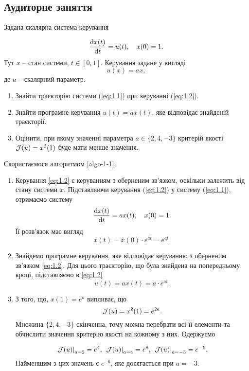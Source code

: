 \subsection{Аудиторне заняття}

\begin{problem}
	Задана скалярна система керування 
	
	\begin{equation}
		\label{eq:1.1}
		\frac{\mathop{}\!\mathrm{d} x(t)}{\mathop{}\!\mathrm{d} t} = u(t), \quad x(0) = 1.
	\end{equation}
	Тут $x$ -- стан системи, $t \in [0, 1]$. Керування задане у вигляді
	\begin{equation}
		\label{eq:1.2}
		u(x) = a x,
	\end{equation}
	де $a$ -- скалярний параметр.

	\begin{enumerate}
		\item Знайти траєкторію системи (\ref{eq:1.1}) при керуванні (\ref{eq:1.2}).

		\item Знайти програмне керування $u(t) = a x (t)$, яке відповідає знайденій траєкторії. 

		\item Оцінити, при якому значенні параметра $a \in \{2, 4, -3\}$ критерій якості $\mathcal{J}(u) = x^2 (1)$ буде мати менше значення.
	\end{enumerate}
\end{problem}

\begin{solution}
    Скористаємося алгоритмом \ref{algo-1-1}.
    
	\begin{enumerate}
	    \item Керування  \eqref{eq:1.2} є керуванням з оберненим зв'язком, оскільки залежить від стану системи $x$. Підставляючи керування (\ref{eq:1.2}) у систему (\ref{eq:1.1}), отримаємо систему \[ \frac{\mathop{}\!\mathrm{d} x(t)}{\mathop{}\!\mathrm{d} t} = a x(t), \quad x(0) = 1. \]
		Її розв'язок має вигляд \[ x(t) = x(0) \cdot e^{a t} = e^{a t}. \]
		\item Знайдемо програмне керування, яке відповідає керуванню з оберненим зв'язком \eqref{eq:1.2}. Для цього траєкторію, що була знайдена на попередньому кроці, підставляємо в \eqref{eq:1.2} \[ u(t) = a x(t) = a \cdot e^{a t}. \]
		\item З того, що, $x(1) = e^{a}$ випливає, що 
		\[\mathcal{J}(u) = x^2 (1)=e^{2a}.\]
		Множина $\{2, 4, -3\}$ скінченна, тому можна  перебрати всі її елементи та обчислити значення критерію якості на кожному з них. Одержуємо 
		
		\[ \left.\mathcal{J} (u) \right|_{a = 2} = e^4, \  \left. \mathcal{J} (u) \right|_{a = 4} = e^8, \ \left. \mathcal{J} (u) \right|_{a = -3} = e^{-6}. \]
		Найменшим з цих значень є $e^{-6}$, яке досягається при $a = -3$.
	\end{enumerate}
\end{solution}

